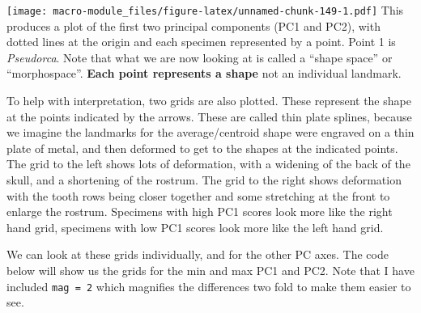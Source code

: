 \documentclass[]{book}
\newenvironment{Shaded}{\begin{snugshade}}{\end{snugshade}}
\newcommand{\KeywordTok}[1]{\textcolor[rgb]{0.13,0.29,0.53}{\textbf{{#1}}}}
\newcommand{\DataTypeTok}[1]{\textcolor[rgb]{0.13,0.29,0.53}{{#1}}}
\newcommand{\StringTok}[1]{\textcolor[rgb]{0.31,0.60,0.02}{{#1}}}
\newcommand{\OtherTok}[1]{\textcolor[rgb]{0.56,0.35,0.01}{{#1}}}
\newcommand{\NormalTok}[1]{{#1}}
\begin{document}
\begin{Shaded}
\end{Shaded}

\texttt{[image: macro-module\_files/figure-latex/unnamed-chunk-149-1.pdf]}
This produces a plot of the first two principal components (PC1 and
PC2), with dotted lines at the origin and each specimen represented by a
point. Point 1 is \emph{Pseudorca}. Note that what we are now looking at
is called a ``shape space'' or ``morphospace''. \textbf{Each point
represents a shape} not an individual landmark.

To help with interpretation, two grids are also plotted. These represent
the shape at the points indicated by the arrows. These are called thin
plate splines, because we imagine the landmarks for the average/centroid
shape were engraved on a thin plate of metal, and then deformed to get
to the shapes at the indicated points. The grid to the left shows lots
of deformation, with a widening of the back of the skull, and a
shortening of the rostrum. The grid to the right shows deformation with
the tooth rows being closer together and some stretching at the front to
enlarge the rostrum. Specimens with high PC1 scores look more like the
right hand grid, specimens with low PC1 scores look more like the left
hand grid.

We can look at these grids individually, and for the other PC axes. The
code below will show us the grids for the min and max PC1 and PC2. Note
that I have included \texttt{mag\ =\ 2} which magnifies the differences
two fold to make them easier to see.
\end{document}
